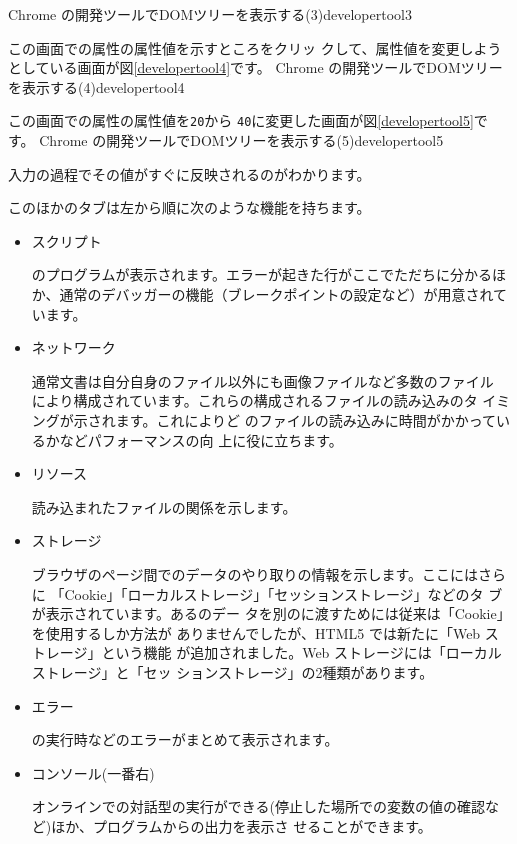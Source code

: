 {Chrome の開発ツールでDOMツリーを表示する(3)}{developertool3}

この画面での属性の属性値を示すところをクリッ
クして、属性値を変更しようとしている画面が図\ref{developertool4}です。
{Chrome の開発ツールでDOMツリーを表示する(4)}{developertool4}

この画面での属性の属性値を\texttt{20}から
\texttt{40}に変更した画面が図\ref{developertool5}です。
{Chrome の開発ツールでDOMツリーを表示する(5)}{developertool5}

入力の過程でその値がすぐに反映されるのがわかります。

このほかのタブは左から順に次のような機能を持ちます。
\begin{itemize}
 \item スクリプト

\JS のプログラムが表示されます。エラーが起きた行がここでただちに分かるほ
       か、通常のデバッガーの機能（ブレークポイントの設定など）が用意されています。
 \item ネットワーク

通常\HTML 文書は自分自身のファイル以外にも画像ファイルなど多数のファイル
       により構成されています。これらの構成されるファイルの読み込みのタ
       イミングが示されます。これによりど
       のファイルの読み込みに時間がかかっているかなどパフォーマンスの向
       上に役に立ちます。
 \item リソース

読み込まれたファイルの関係を示します。
 \item ストレージ

ブラウザのページ間でのデータのやり取りの情報を示します。ここにはさらに
       「Cookie」「ローカルストレージ」「セッションストレージ」などのタ
       ブが表示されています。ある\HTML のデー
       タを別の\HTML に渡すためには従来は「Cookie」を使用するしか方法が
       ありませんでしたが、HTML5 では新たに「Web ストレージ」という機能
       が追加されました。Web ストレージには「ローカルストレージ」と「セッ
       ションストレージ」の2種類があります。
 \item エラー

\JS の実行時などのエラーがまとめて表示されます。
 \item コンソール(一番右)

オンラインで\JS の対話型の実行ができる(停止した場所での変数の値の確認な
       ど)ほか、プログラムからの出力を表示さ
       せることができます。
\end{itemize}

